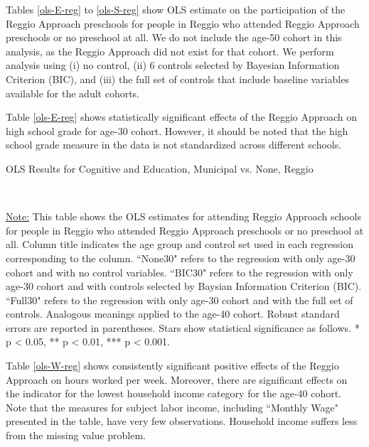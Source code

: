 
Tables \ref{ols-E-reg} to \ref{ols-S-reg} show OLS estimate on the participation of the Reggio Approach preschools for people in Reggio who attended Reggio Approach preschools or no preschool at all. We do not include the age-50 cohort in this analysis, as the Reggio Approach did not exist for that cohort. We perform analysis using (i) no control, (ii) 6 controls selected by Bayesian Information Criterion (BIC), and (iii) the full set of controls that include baseline variables available for the adult cohorts. 

Table \ref{ols-E-reg} shows statistically significant effects of the Reggio Approach on high school grade for age-30 cohort. However, it should be noted that the high school grade measure in the data is not standardized across different schools. 


\begin{table}[H] \caption{OLS Results for Cognitive and Education, Municipal vs. None, Reggio} \label{ols-E-reg}

\vspace{1ex} \\
\footnotesize\raggedright{\underline{Note:} This table shows the OLS estimates for attending Reggio Approach schools for people in Reggio who attended Reggio Approach preschools or no preschool at all. Column title indicates the age group and control set used in each regression corresponding to the column. ``None30" refers to the regression with only age-30 cohort and with no control variables. ``BIC30" refers to the regression with only age-30 cohort and with controls selected by Baysian Information Criterion (BIC). ``Full30" refers to the regression with only age-30 cohort and with the full set of controls. Analogous meanings applied to the age-40 cohort. Robust standard errors are reported in parentheses. Stars show statistical significance as follows. * p < 0.05, ** p < 0.01, *** p < 0.001.}
\end{table}

Table \ref{ols-W-reg} shows consistently significant positive effects of the Reggio Approach on hours worked per week. Moreover, there are significant effects on the indicator for the lowest household income category for the age-40 cohort. Note that the measures for subject labor income, including ``Monthly Wage" presented in the table, have very few observations. Household income suffers less from the missing value problem.

